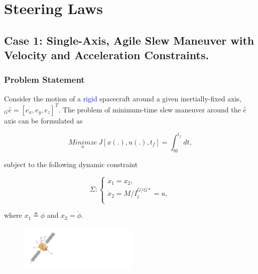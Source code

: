 \documentclass[letterpaper, preprint, paper,11pt]{AAS}	%
\begin{document}
	
	\section{Steering Laws} 
	
	\subsection{Case 1: Single-Axis, Agile Slew Maneuver with Velocity and Acceleration Constraints.}	 
	
	\subsubsection{Problem Statement}
	
	Consider the motion of a \textcolor{blue}{rigid} spacecraft around a given inertially-fixed axis, $_G\hat{e}=[e_x,e_y,e_z]^T$. The problem of minimum-time slew maneuver around the $\hat{e}$ axis can be formulated as
	
	\begin{equation}\label{costfunction}
	\underset{u}{Minimze}\ J[x(.), u(.), t_f]=\int_{t0}^{t_f} dt,
	\end{equation}
	
	subject to the following dynamic constraint
	
	\begin{equation}\label{system}
	\Sigma:\left\{
	\begin{array}{l}
	\dot{x}_1=x_2, \\
	\dot{x}_2=M/I_{\hat{e}}^{G/G*}=u, \\
	\end{array}
	\right.
	\end{equation}
	
	where $x_1 \triangleq\phi$ and $x_2=\dot{\phi}$. 
	
	\begin{figure}[H]
		\begin{center}
			\includegraphics[width=2.25in]{./Figures/Spacecraft}  
		\end{center}    
	\end{figure}
	
\end{document}

